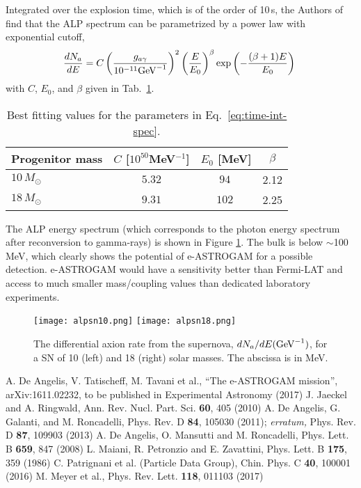 \documentclass[aps,12pt,tightenlines,amsmath,amssymb]{revtex4}
\begin{document}
Integrated over the explosion time, which is of the order of 10\,s, the Authors of  \cite{meyer2017}
 find that the ALP spectrum can be parametrized by a power law with exponential cutoff,
\begin{equation}
\frac{dN_a}{dE} = C \left(\frac{g_{a\gamma}}{10^{-11}{\rm{GeV}}^{-1}}\right)^2
\left(\frac{E}{E_0}\right)^\beta \exp\left( -\frac{(\beta + 1) E}{E_0}\right) \,\, 
\label{eq:time-int-spec}
\end{equation}
with $ C $, $ E_0 $, and $ \beta $ given in Tab.~\ref{tab:rate_parameters}.
\begin{table}[h]
	\begin{center}
		\begin{tabular}{ l  c  c   c  }
			\hline \hline
			Progenitor mass			& $ C $ [$10^{50}${MeV}$^{-1} $]		&  $ E_0 $ [MeV] 					& $ \beta  $    \\ \hline 
			$10\,M_\odot$	& $ 5.32$  	& $ 94 ~ $  	& 2.12		\\ 
			$18\,M_\odot$	&	$ 9.31 $	& $102 ~ $   	& 2.25  \\ \hline
		\end{tabular}
		\caption{Best fitting values for the parameters in Eq.~\eqref{eq:time-int-spec}.}
		\label{tab:rate_parameters}   
	\end{center}
\end{table}

The ALP energy spectrum (which corresponds to the photon energy spectrum after reconversion to gamma-rays) is shown in Figure \ref{fig:alpsn}.  The bulk is below $\sim$100 MeV, which clearly shows the potential of e-ASTROGAM for a possible detection.  e-ASTROGAM
would have a sensitivity better than Fermi-LAT and access to much
smaller mass/coupling values than dedicated laboratory experiments.


\begin{figure}[h]
\centering
\texttt{[image: alpsn10.png]}
\texttt{[image: alpsn18.png]}
\caption{\label{fig:alpsn} The differential axion rate from the supernova, $dN_a/dE ({\rm{GeV}}^{-1})$, for a SN of 10 (left) and 18 (right) solar masses. The abscissa is in MeV.}
\end{figure}

\begin{thebibliography}{99}
 A. De Angelis, V. Tatischeff, M. Tavani et al., ``The e-ASTROGAM mission'', arXiv:1611.02232, to be published in Experimental Astronomy (2017)
 J. Jaeckel and A. Ringwald,  Ann. Rev. Nucl. Part. Sci. {\bf 60}, 405 (2010)
 A. De Angelis, G. Galanti, and M. Roncadelli, Phys. Rev.
D {\bf 84}, 105030 (2011); {\em erratum,} Phys. Rev. D {\bf 87}, 109903 (2013)
 A. De Angelis, O. Mansutti and M. Roncadelli, Phys. Lett. B {\bf 659}, 847 (2008)
 L. Maiani, R. Petronzio and E. Zavattini, Phys. Lett. B {\bf 175}, 359 (1986) 
 C. Patrignani et al. (Particle Data Group), Chin. Phys. C {\bf 40}, 100001 (2016)
 M. Meyer et al., Phys. Rev. Lett. {\bf 118}, 011103 (2017)
\end{thebibliography}
\end{document}
